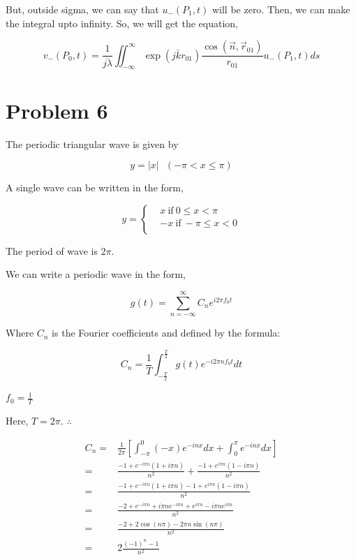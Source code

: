 \documentclass[a4paper,11pt]{article}
\begin{document}
But, outside sigma, we can say that \(u_-(P_1,t)\) will be zero. Then, we can make the integral upto infinity. So, we will get the equation,

\begin{equation}
v_-(P_0,t)= \frac{1}{\bar{j\lambda}} \iint_{-\infty}^\infty \exp\left(j\bar{k} r_{01}\right) \frac{\cos(\vec{n},\vec{r}_{01})}{r_{01}} u_-(P_1,t) ds
\end{equation}

\newpage
\section*{Problem 6}
\label{sec:org7caf297}


The periodic triangular wave is given by

\begin{equation*}
y = |x| ~~~(-\pi < x \leq \pi )
\end{equation*}

A single wave can be written in the form,

\begin{equation}
\label{eq:org808bd77}
y = \begin{cases}
&x~ \text{if}~ 0\leq x<\pi \\
&-x~ \text{if}~ -\pi\leq x<0 \\
\end{cases}
\end{equation}

The period of wave is \(2\pi\).

We can write a periodic wave in the form,

\begin{equation}
\label{eq:org093d9f7}
g(t) = \sum_{n=-\infty}^{\infty} C_n e^{i 2\pi f_0 t} 
\end{equation}

Where \(C_n\) is the Fourier coefficients and defined by the formula:

\begin{equation}
\label{eq:org76b2d66}
C_n=\frac{1}{T}\int_{-\frac{T}{2}}^{\frac{T}{2}} g(t) e^{-i 2\pi n f_0t} dt
\end{equation}

\(f_0=\frac{1}{T}\)

Here, \(T=2\pi\). \(\therefore\)

\begin{equation*}
\begin{split}
C_n = & \frac{1}{2\pi} \left[\int_{-\pi}^0 (-x) e^{-i n x} dx + \int_{0}^{\pi} e^{-i nx} dx\right]\\
= & \frac{-1+e^{-i \pi  n} (1+i \pi  n)}{n^2}+\frac{-1+e^{i \pi  n} (1-i \pi  n)}{n^2} \\
= & \frac{-1+e^{-i \pi  n} (1+i \pi  n)-1+e^{i \pi  n} (1-i \pi  n)}{n^2}\\
= & \frac{-2+e^{-i \pi n}+i \pi n e^{-i \pi  n}+e^{i \pi n}-i \pi n e^{i \pi n}}{n^2} \\
= & \frac{-2+2\cos(n\pi)-2 \pi n \sin(n\pi)}{n^2} \\
= & 2\frac{ (-1)^n-1}{n^2}
\end{split}
\end{equation*}
\end{document}
